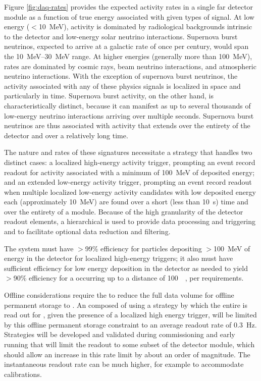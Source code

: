 Figure \ref{fig:daq-rates} provides the expected activity rates in a
single far detector module as a function of true energy associated
with given types of signal.
At low energy ($<$\SI{10}{\MeV}), activity is dominated by radiological backgrounds
intrinsic to the detector and
low-energy solar neutrino interactions. Supernova burst neutrinos,
expected to arrive at a galactic  rate of once per century, 
would span the \SIrange{10}{30}{\MeV} range. At higher energies (generally
more than \SI{100}{\MeV}), rates are dominated by cosmic rays, beam neutrino interactions,
and atmospheric neutrino interactions. With the exception of supernova
burst neutrinos, the activity associated with any of these physics
signals is localized in space and particularly in time. Supernova burst
activity, on the other hand, is characteristically distinct, because it can
manifest as up to several thousands of low-energy neutrino interactions
arriving over multiple seconds. Supernova burst neutrinos
are thus associated with activity that extends over the entirety of the
detector and over a relatively long time.

The nature and rates of these signatures necessitate a  strategy that handles two
distinct cases: a localized high-energy activity trigger, prompting an event record readout for
activity associated with a minimum of \SI{100}{\MeV} of deposited energy; and an extended low-energy
activity trigger, prompting an event record readout when multiple localized low-energy activity
candidates with low deposited energy each (approximately \SI{10}{\MeV}) are found over a short (less than
\SI{10}{\second}) time and over the entirety of a \nominalmodsize  module. Because of the high
granularity of the detector readout elements, a hierarchical  is used to
provide data processing and triggering and to facilitate optional data reduction and filtering. 

The   system must have $>$99\% efficiency for particles depositing $>$\SI{100}{\MeV}
of energy in the detector for localized high-energy triggers; it also must have
sufficient efficiency for low energy deposition in the detector as
needed to yield $>$90\% efficiency for a  occurring up to a
distance of \SI{100}{\kilo\parsec}, per  requirements.

Offline considerations require the  to reduce the
full  data volume for offline permanent storage to  \offsitepbpy.
An  composed of  using a
strategy by which the entire  is read out for \spreadout, 
given the presence of a localized high energy trigger, will be limited
by this offline permanent storage constraint to an average readout rate of \SI{0.3}{\hertz}. 
Strategies will be developed and validated during commissioning and early running that will limit the readout to some subset of the detector module, which should allow an increase in this rate limit by about an order of magnitude.
The instantaneous readout rate can be much higher, for example to accommodate calibrations.


